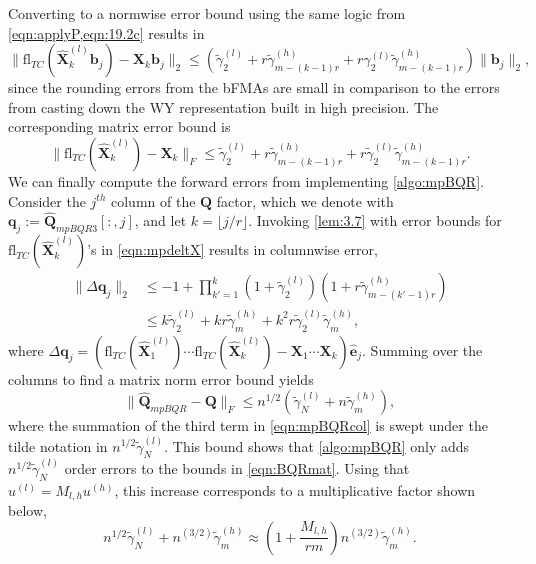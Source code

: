 \documentclass[review,onefignum,onetabnum]{siamart190516}
\newcommand{\bb}[1]{\mathbf{#1}}
\newcommand{\fl}{\mathrm{fl}}
\begin{document}
Converting to a normwise error bound using the same logic from \cref{eqn:applyP,eqn:19.2c} results in
\begin{equation}
\|\fl_{TC}(\hat{\bb{X}}_{k}^{(l)}\bb{b}_j)-\bb{X}_k\bb{b}_j\|_2 \leq (\tilde{\gamma}_2^{(l)} +r\tilde{\gamma}_{m-(k-1)r}^{(h)} + r\gamma_2^{(l)}\tilde{\gamma}_{m-(k-1)r}^{(h)}) \|\bb{b}_j\|_2, 
\end{equation}
since the rounding errors from the bFMAs are small in comparison to the errors from casting down the WY representation built in high precision.
The corresponding matrix error bound is
\begin{equation}
	\|\fl_{TC}(\hat{\bb{X}}_{k}^{(l)})-\bb{X}_k\|_F \leq \tilde{\gamma}_2^{(l)} +r\tilde{\gamma}_{m-(k-1)r}^{(h)} + r\tilde{\gamma}_2^{(l)}\tilde{\gamma}_{m-(k-1)r}^{(h)}.\label{eqn:mpdeltX}
\end{equation}
We can finally compute the forward errors from implementing \cref{algo:mpBQR}.
Consider the $j^{th}$ column of the $\bb{Q}$ factor, which we denote with $\bb{q}_j:=\hat{\bb{Q}}_{mpBQR3}[:,j]$, and let $k = \lfloor j/r\rfloor$.
Invoking \cref{lem:3.7} with error bounds for $\fl_{TC}(\hat{\bb{X}}_k^{(l)})$'s in \cref{eqn:mpdeltX} results in columnwise error,
\begin{align}
	\|\Delta \bb{q}_j \|_2 &\leq -1 + \prod_{k'=1}^k (1+\tilde{\gamma}_2^{(l)})(1+r\tilde{\gamma}_{m-(k'-1)r}^{(h)})\\ 
	&\leq k\tilde{\gamma}_{2}^{(l)} + kr\tilde{\gamma}_m^{(h)} + k^2r\tilde{\gamma}_{2}^{(l)}\tilde{\gamma}_m^{(h)}, \label{eqn:mpBQRcol}
\end{align} 
where $\Delta \bb{q}_j = (\fl_{TC}(\hat{\bb{X}}_1^{(l)})\cdots\fl_{TC}(\hat{\bb{X}}_k^{(l)}) - \bb{X}_1\cdots\bb{X}_k )\hat{\bb{e}}_j.$
Summing over the columns to find a matrix norm error bound yields
\begin{equation}
	\|\hat{\bb{Q}}_{mpBQR}-\bb{Q}\|_F \leq n^{1/2}\left(\tilde{\gamma}_{N}^{(l)} + n\tilde{\gamma}_m^{(h)}\right),\label{eqn:mpBQR3err}
\end{equation}
where the summation of the third term in \cref{eqn:mpBQRcol} is swept under the tilde notation in $n^{1/2} \tilde{\gamma}_{N}^{(l)}$.
This bound shows that \cref{algo:mpBQR} only adds $n^{1/2}\tilde{\gamma}_{N}^{(l)}$ order errors to the bounds in \cref{eqn:BQRmat}.
Using that $u^{(l)}=M_{l,h}u^{(h)}$, this increase corresponds to a multiplicative factor shown below,
\begin{equation}
	n^{1/2}\tilde{\gamma}_{N}^{(l)} + n^{(3/2)}\tilde{\gamma}_m^{(h)} \approx \left(1+\frac{M_{l,h}}{rm}\right)n^{(3/2)}\tilde{\gamma}_m^{(h)}. \label{eqn:mpBQR3}
\end{equation}
\end{document}
